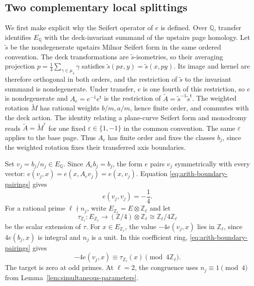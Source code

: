 \subsection{Two complementary local splittings}\label{subsec:arith-local}

We first make explicit why the Seifert operator of $e$ is defined.
Over $\mathbb Q$, transfer identifies $E_{\mathbb Q}$ with the
deck-invariant summand of the upstairs page homology. Let
$\widetilde s$ be the nondegenerate upstairs Milnor Seifert form
in the same ordered convention.
The deck transformations are $\widetilde s$-isometries, so their
averaging projection $p=\frac14\sum_{\gamma\in\mu_4}\gamma$ satisfies
$\widetilde s(px,y)=\widetilde s(x,py)$. Its image and kernel are
therefore orthogonal in both orders, and the restriction of
$\widetilde s$ to the invariant summand is nondegenerate. Under
transfer, $e$ is one fourth of this restriction,
so $e$ is nondegenerate and
$A_e=e^{-1}e^{\mathsf t}$ is the restriction of
$\widetilde A=\widetilde s^{-1}\widetilde s^{\mathsf t}$.
The weighted rotation $\widetilde M$ has rational weights $b/m,a/m$,
hence finite order, and commutes with the deck action. The identity
relating a plane-curve Seifert form and monodromy reads
$\widetilde A=\widetilde M^\varepsilon$ for one fixed
$\varepsilon\in\{1,-1\}$ in the common convention. The same
$\varepsilon$ applies to the base page. Thus $A_e$
has finite order and fixes the classes $b_j$, since the weighted
rotation fixes their transferred axis boundaries.

Set $v_j=b_j/n_j\in E_{\mathbb Q}$.  Since $A_eb_j=b_j$,
the form $e$ pairs $v_j$ symmetrically with every vector:
$e(v_j,x)=e(x,A_ev_j)=e(x,v_j)$.
Equation \eqref{eq:arith-boundary-pairings} gives
\begin{equation}\label{eq:arith-v-norm}
 e(v_j,v_j)=-\frac14.
\end{equation}
For a rational prime $\ell\nmid n_j$, write
$E_{\mathbb Z_\ell}=E\otimes\mathbb Z_\ell$ and let
\[
 \tau_{\mathbb Z_\ell}\colon E_{\mathbb Z_\ell}
 \longrightarrow(\mathbb Z/4)\otimes\mathbb Z_\ell
 \cong\mathbb Z_\ell/4\mathbb Z_\ell
\]
be the scalar extension of $\tau$. For $x\in E_{\mathbb Z_\ell}$,
the value $-4e(v_j,x)$ lies in $\mathbb Z_\ell$, since
$4e(b_j,x)$ is integral and $n_j$ is a unit. In this coefficient
ring, \eqref{eq:arith-boundary-pairings} gives
\[
 -4e(v_j,x)\equiv\tau_{\mathbb Z_\ell}(x)
       \pmod{4\mathbb Z_\ell}.
\]
The target is zero at odd primes. At $\ell=2$, the congruence uses
$n_j\equiv1\pmod4$ from Lemma~\ref{lem:simultaneous-parameters}.

